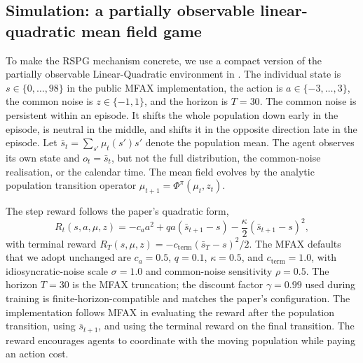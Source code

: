 \subsection{Simulation: a partially observable linear-quadratic mean field game}
\label{sec:macro:mfg_sim}

To make the RSPG mechanism concrete, we use a compact version of the
partially observable Linear-Quadratic environment in
\citet{Wibault2026rspg}. The individual state is
$s \in \{0,\ldots,98\}$ in the public MFAX implementation, the action
is $a \in \{-3,\ldots,3\}$, the common noise is
$z \in \{-1,1\}$, and the horizon is $T = 30$. The common noise is
persistent within an episode. It shifts the whole population down
early in the episode, is neutral in the middle, and shifts it in the
opposite direction late in the episode. Let
$\bar{s}_t = \sum_{s'} \mu_t(s')s'$ denote the population mean. The
agent observes its own state and $o_t = \bar{s}_t$, but not the full
distribution, the common-noise realisation, or the calendar time. The
mean field evolves by the analytic population transition operator
$\mu_{t+1} = \Phi^{\pi}(\mu_t,z_t)$.

The step reward follows the paper's quadratic form,
\begin{equation}
R_t(s,a,\mu,z)
= -c_a a^2 + q a(\bar{s}_{t+1} - s)
  - \frac{\kappa}{2}(\bar{s}_{t+1} - s)^2,
\label{eq:macro:lqmfg-reward}
\end{equation}
with terminal reward
$R_T(s,\mu,z) = -c_{\mathrm{term}}(\bar{s}_T - s)^2/2$.
The MFAX defaults that we adopt unchanged are $c_a = 0.5$, $q = 0.1$,
$\kappa = 0.5$, and $c_{\mathrm{term}} = 1.0$, with idiosyncratic-noise
scale $\sigma = 1.0$ and common-noise sensitivity $\rho = 0.5$. The
horizon $T = 30$ is the MFAX truncation; the discount factor
$\gamma = 0.99$ used during training is finite-horizon-compatible and
matches the paper's configuration. The implementation follows MFAX in
evaluating the reward after the population transition, using
$\bar{s}_{t+1}$, and using the terminal reward on the final
transition. The reward encourages agents to coordinate with the moving
population while paying an action cost.


